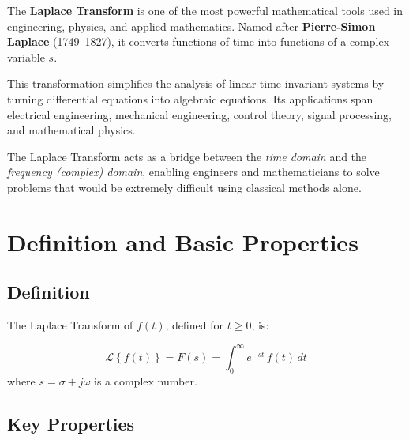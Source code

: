 \documentclass[12pt]{article}
\newcommand{\Lap}[1]{\mathcal{L}\!\left\{#1\right\}}
\begin{document}
\begin{conceptbox}
The \textbf{Laplace Transform} is one of the most powerful mathematical tools used in engineering,
physics, and applied mathematics. Named after \textbf{Pierre-Simon Laplace} (1749--1827), it converts
functions of time into functions of a complex variable $s$.
\end{conceptbox}

\medskip
This transformation simplifies the analysis of linear time-invariant systems by turning differential
equations into algebraic equations. Its applications span electrical engineering, mechanical
engineering, control theory, signal processing, and mathematical physics.

The Laplace Transform acts as a bridge between the \emph{time domain} and the
\emph{frequency (complex) domain}, enabling engineers and mathematicians to solve problems that
would be extremely difficult using classical methods alone.

\section{Definition and Basic Properties}

\subsection*{Definition}

The Laplace Transform of $f(t)$, defined for $t \geq 0$, is:

\begin{formulabox}
\[
  \Lap{f(t)} = F(s) = \int_{0}^{\infty} e^{-st}\, f(t)\, dt
\]
where $s = \sigma + j\omega$ is a complex number.
\end{formulabox}

\subsection*{Key Properties}
\end{document}
